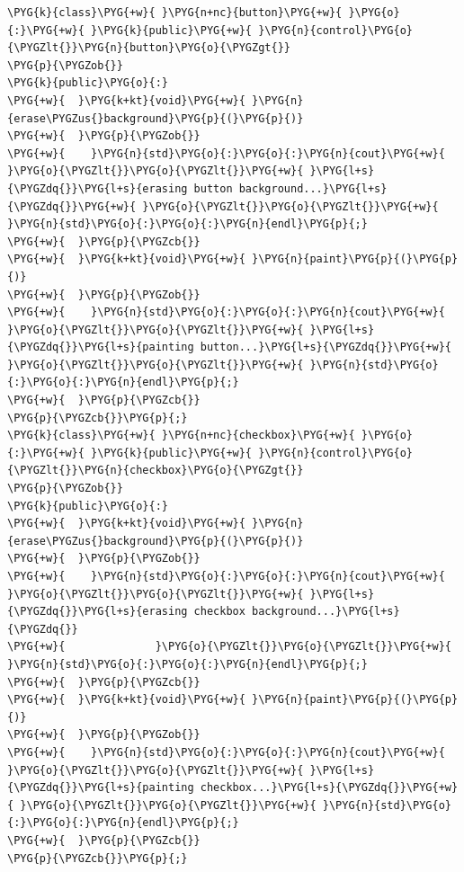 \begin{codeblockbg}
\begin{Verbatim}[commandchars=\\\{\},breaklines=true,breakanywhere=true,fontsize=\codefont,xleftmargin=17bp]
\PYG{k}{class}\PYG{+w}{ }\PYG{n+nc}{button}\PYG{+w}{ }\PYG{o}{:}\PYG{+w}{ }\PYG{k}{public}\PYG{+w}{ }\PYG{n}{control}\PYG{o}{\PYGZlt{}}\PYG{n}{button}\PYG{o}{\PYGZgt{}}
\PYG{p}{\PYGZob{}}
\PYG{k}{public}\PYG{o}{:}
\PYG{+w}{  }\PYG{k+kt}{void}\PYG{+w}{ }\PYG{n}{erase\PYGZus{}background}\PYG{p}{(}\PYG{p}{)}
\PYG{+w}{  }\PYG{p}{\PYGZob{}}
\PYG{+w}{    }\PYG{n}{std}\PYG{o}{:}\PYG{o}{:}\PYG{n}{cout}\PYG{+w}{ }\PYG{o}{\PYGZlt{}}\PYG{o}{\PYGZlt{}}\PYG{+w}{ }\PYG{l+s}{\PYGZdq{}}\PYG{l+s}{erasing button background...}\PYG{l+s}{\PYGZdq{}}\PYG{+w}{ }\PYG{o}{\PYGZlt{}}\PYG{o}{\PYGZlt{}}\PYG{+w}{ }\PYG{n}{std}\PYG{o}{:}\PYG{o}{:}\PYG{n}{endl}\PYG{p}{;}
\PYG{+w}{  }\PYG{p}{\PYGZcb{}}
\PYG{+w}{  }\PYG{k+kt}{void}\PYG{+w}{ }\PYG{n}{paint}\PYG{p}{(}\PYG{p}{)}
\PYG{+w}{  }\PYG{p}{\PYGZob{}}
\PYG{+w}{    }\PYG{n}{std}\PYG{o}{:}\PYG{o}{:}\PYG{n}{cout}\PYG{+w}{ }\PYG{o}{\PYGZlt{}}\PYG{o}{\PYGZlt{}}\PYG{+w}{ }\PYG{l+s}{\PYGZdq{}}\PYG{l+s}{painting button...}\PYG{l+s}{\PYGZdq{}}\PYG{+w}{ }\PYG{o}{\PYGZlt{}}\PYG{o}{\PYGZlt{}}\PYG{+w}{ }\PYG{n}{std}\PYG{o}{:}\PYG{o}{:}\PYG{n}{endl}\PYG{p}{;}
\PYG{+w}{  }\PYG{p}{\PYGZcb{}}
\PYG{p}{\PYGZcb{}}\PYG{p}{;}
\PYG{k}{class}\PYG{+w}{ }\PYG{n+nc}{checkbox}\PYG{+w}{ }\PYG{o}{:}\PYG{+w}{ }\PYG{k}{public}\PYG{+w}{ }\PYG{n}{control}\PYG{o}{\PYGZlt{}}\PYG{n}{checkbox}\PYG{o}{\PYGZgt{}}
\PYG{p}{\PYGZob{}}
\PYG{k}{public}\PYG{o}{:}
\PYG{+w}{  }\PYG{k+kt}{void}\PYG{+w}{ }\PYG{n}{erase\PYGZus{}background}\PYG{p}{(}\PYG{p}{)}
\PYG{+w}{  }\PYG{p}{\PYGZob{}}
\PYG{+w}{    }\PYG{n}{std}\PYG{o}{:}\PYG{o}{:}\PYG{n}{cout}\PYG{+w}{ }\PYG{o}{\PYGZlt{}}\PYG{o}{\PYGZlt{}}\PYG{+w}{ }\PYG{l+s}{\PYGZdq{}}\PYG{l+s}{erasing checkbox background...}\PYG{l+s}{\PYGZdq{}}
\PYG{+w}{              }\PYG{o}{\PYGZlt{}}\PYG{o}{\PYGZlt{}}\PYG{+w}{ }\PYG{n}{std}\PYG{o}{:}\PYG{o}{:}\PYG{n}{endl}\PYG{p}{;}
\PYG{+w}{  }\PYG{p}{\PYGZcb{}}
\PYG{+w}{  }\PYG{k+kt}{void}\PYG{+w}{ }\PYG{n}{paint}\PYG{p}{(}\PYG{p}{)}
\PYG{+w}{  }\PYG{p}{\PYGZob{}}
\PYG{+w}{    }\PYG{n}{std}\PYG{o}{:}\PYG{o}{:}\PYG{n}{cout}\PYG{+w}{ }\PYG{o}{\PYGZlt{}}\PYG{o}{\PYGZlt{}}\PYG{+w}{ }\PYG{l+s}{\PYGZdq{}}\PYG{l+s}{painting checkbox...}\PYG{l+s}{\PYGZdq{}}\PYG{+w}{ }\PYG{o}{\PYGZlt{}}\PYG{o}{\PYGZlt{}}\PYG{+w}{ }\PYG{n}{std}\PYG{o}{:}\PYG{o}{:}\PYG{n}{endl}\PYG{p}{;}
\PYG{+w}{  }\PYG{p}{\PYGZcb{}}
\PYG{p}{\PYGZcb{}}\PYG{p}{;}
\end{Verbatim}
\end{codeblockbg}


